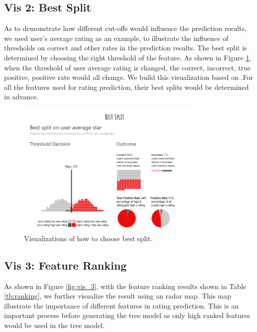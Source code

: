 \documentclass{vgtc}                          %
\begin{document}
\subsection{Vis 2: Best Split}

As to demonstrate how different cut-offs would influence the prediction results, we used user's average rating as an example, to illustrate the influence of thresholds on correct and other rates in the prediction results. The best split is determined by choosing the right threshold of the feature. As shown in Figure \ref{fig:vis_2}, when the threshold of user average rating is changed, the correct, incorrect, true positive, positive rate would all change. We build this visualization based on \cite{bestsplit}.For all the features used for rating prediction, their best splits would be determined in advance. 


\begin{figure}[h]
  \centering
  \includegraphics[width=9cm]{vis_2.png}
  \caption{Visualizations of how to choose best split.}
  \label{fig:vis_2}
\end{figure}

\subsection{Vis 3: Feature Ranking}

As shown in Figure \ref{fig:vis_3}, with the feature ranking results shown in Table \ref{tb:ranking}, we further visualize the result using an radar map. This map illustrate the importance of different features in rating prediction. This is an important process before generating the tree model as only high ranked features would be used in the tree model. 
\end{document}
